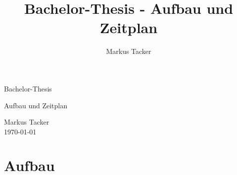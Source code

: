 \documentclass[11pt,a4paper]{article}
\begin{document}
\author{Markus Tacker}
\title{Bachelor-Thesis - Aufbau und Zeitplan}

\begin{center}

\begin{huge}Bachelor-Thesis\end{huge}

\bigskip

Aufbau und Zeitplan

\begin{small}Markus Tacker\\
\today

\end{small}

\end{center}

\section{Aufbau}
\end{document}
